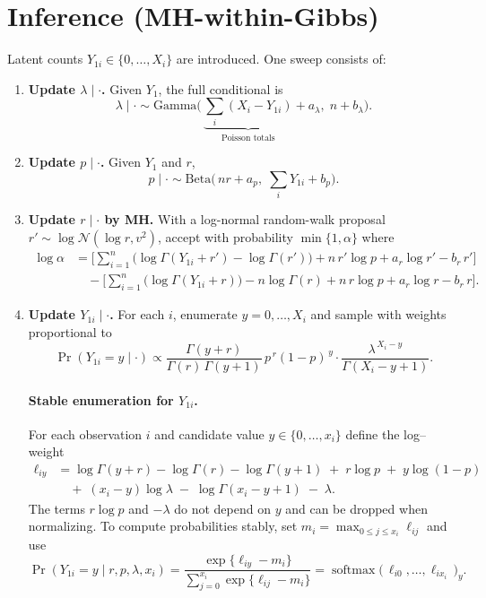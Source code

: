 \documentclass[11pt,a4paper]{article}
\theoremstyle{definition}
\theoremstyle{remark}
\begin{document}
    \section{Inference (MH-within-Gibbs)}
    \label{sec:inference}
    Latent counts $Y_{1i}\in\{0,\dots,X_i\}$ are introduced. One sweep consists of:
    \begin{enumerate}
    \item \textbf{Update $\lambda\mid\cdot$.} Given $Y_1$, the full conditional is
    \[
    \lambda\mid\cdot \sim \mathrm{Gamma}\Big(\,\underbrace{\sum_i (X_i - Y_{1i})}_{\text{Poisson totals}} + a_\lambda,\; n + b_\lambda\Big).
    \]
    
    \item \textbf{Update $p\mid\cdot$.} Given $Y_1$ and $r$,
    \[
    p\mid\cdot \sim \mathrm{Beta}\big(\,n r + a_p,\; \sum_i Y_{1i} + b_p\big).
    \]
    
    \item \textbf{Update $r\mid\cdot$ by MH.} With a log-normal random-walk proposal
    $r' \sim \log\mathcal N(\log r, v^2)$, accept with probability $\min\{1,\alpha\}$ where
    \begin{align*}
    \log \alpha
    &=
    \Bigg[
      \sum_{i=1}^n \big(\log\Gamma(Y_{1i}+r') - \log\Gamma(r')\big)
      + n\,r'\log p
      + a_r\log r'
      - b_r\,r'
    \Bigg]
    \\
    &\quad - \Bigg[
      \sum_{i=1}^n \big(\log\Gamma(Y_{1i}+r)\big) - n\log\Gamma(r)
      + n\,r\log p
      + a_r\log r
      - b_r\,r
    \Bigg].
    \end{align*}
    \noindent
    
    \item \textbf{Update $Y_{1i}\mid\cdot$.} For each $i$, enumerate $y=0,\dots,X_i$ and sample with weights proportional to
    \[
    \Pr(Y_{1i}=y\mid\cdot) \propto
    \frac{\Gamma(y+r)}{\Gamma(r)\,\Gamma(y+1)}\, p^{\,r} (1-p)^{\,y}
    \cdot
    \frac{\lambda^{\,X_i-y}}{\Gamma(X_i-y+1)}.
    \]
    
    \paragraph{Stable enumeration for $Y_{1i}$.}
    For each observation $i$ and candidate value $y\in\{0,\ldots,x_i\}$ define the log–weight
    \begin{align*}
    \ell_{iy}
    &= \log\Gamma(y+r) - \log\Gamma(r) - \log\Gamma(y+1)
      \;+\; r\log p \;+\; y\log(1-p) \\
    &\quad +\; (x_i - y)\log \lambda \;-\; \log\Gamma(x_i - y + 1)
      \;-\; \lambda.
    \end{align*}
    The terms $r\log p$ and $-\lambda$ do not depend on $y$ and can be dropped when normalizing.
    To compute probabilities stably, set $m_i=\max_{0\le j\le x_i}\ell_{ij}$ and use
    \[
    \Pr(Y_{1i}=y \mid r,p,\lambda,x_i)
    = \frac{\exp\{\ell_{iy}-m_i\}}{\sum_{j=0}^{x_i}\exp\{\ell_{ij}-m_i\}}
    = \operatorname{softmax}\big(\,\ell_{i0},\ldots,\ell_{ix_i}\,\big)_y .
    \]


\end{enumerate}
\end{document}
